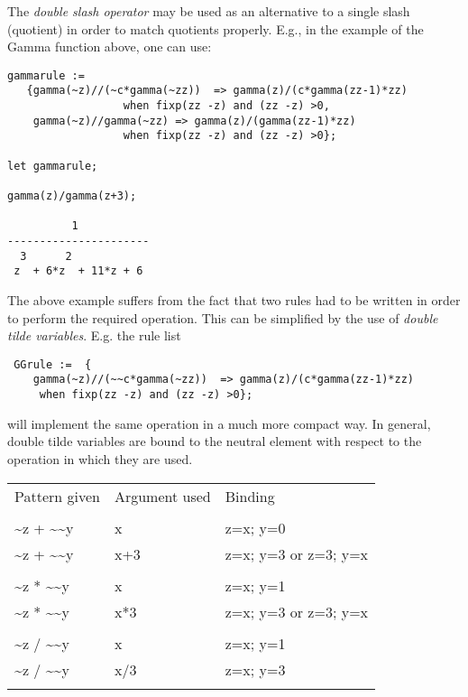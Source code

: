 \hypertarget{reserved:doubleslashop}{}
The \emph{double slash operator} may be used as an alternative to a single
slash (quotient) in order to match quotients properly.  E.g., in the
example of the Gamma function above, one can use:
\begin{verbatim}
gammarule :=
   {gamma(~z)//(~c*gamma(~zz))  => gamma(z)/(c*gamma(zz-1)*zz)
                  when fixp(zz -z) and (zz -z) >0,
    gamma(~z)//gamma(~zz) => gamma(z)/(gamma(zz-1)*zz)
                  when fixp(zz -z) and (zz -z) >0};

let gammarule;

gamma(z)/gamma(z+3);

          1
----------------------
  3      2
 z  + 6*z  + 11*z + 6
\end{verbatim}
The above example suffers from the fact that two rules had to be
written in order to perform the required operation. This can be simplified
by the use of \emph{double tilde variables}. E.g. the rule list
\begin{verbatim}
 GGrule :=  {
    gamma(~z)//(~~c*gamma(~zz))  => gamma(z)/(c*gamma(zz-1)*zz)
     when fixp(zz -z) and (zz -z) >0};
\end{verbatim}
will implement the same operation in a much more compact way.
In general, double tilde variables are bound to the neutral element
with respect to the operation in which they are used.

\begin{tabular}{lll}

Pattern given & Argument used & Binding  \\
\\
\textasciitilde z + \textasciitilde \textasciitilde y  &   x   &  z=x; y=0  \\   
\textasciitilde z + \textasciitilde \textasciitilde y  &   x+3 &  z=x; y=3  or  z=3; y=x \\ 
\\
\textasciitilde z * \textasciitilde \textasciitilde y  &   x   &  z=x; y=1\\
\textasciitilde z * \textasciitilde \textasciitilde y  &   x*3 &  z=x; y=3  or  z=3; y=x\\
\\
\textasciitilde z / \textasciitilde \textasciitilde y  &    x   &  z=x; y=1\\
\textasciitilde z / \textasciitilde \textasciitilde y  &    x/3 &  z=x; y=3  \\
\\
\end{tabular}

